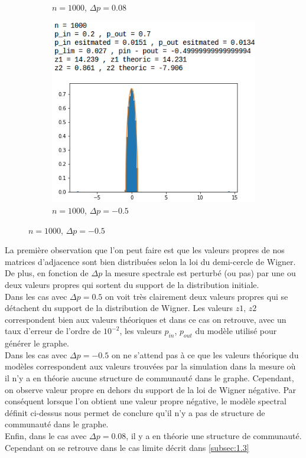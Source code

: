 \begin{figure}[H]
\begin{subfigure}{.5\textwidth}
		\caption{$n=1000$, $\Delta p=0.08$}
	\end{subfigure}
	\begin{subfigure}{.5\textwidth}
		\centering
		\includegraphics[scale=0.58]{static/spectral_n1000_pin02_pout07.png}
		\caption{$n=1000$, $\Delta p=-0.5$}
	\end{subfigure}
\end{figure}

La première observation que l'on peut faire est que les valeurs propres de nos matrices d'adjacence sont bien distribuées selon la loi du demi-cercle de Wigner.
De plus, en fonction de $\Delta p$ la mesure spectrale est perturbé (ou pas) par une ou deux valeurs propres qui sortent du support de la distribution initiale.\\

Dans les cas avec $\Delta p = 0.5$ on voit très clairement deux valeurs propres qui se détachent du support de la distribution de Wigner.
Les valeurs $z1$, $z2$ correspondent bien aux valeurs théoriques et dans ce cas on retrouve, avec un taux d'erreur de l'ordre de $10^{-2}$, les valeurs $p_{in}$, $p_{out}$ du modèle utilisé pour générer le graphe.\\
Dans les cas avec $\Delta p = -0.5$ on ne s'attend pas à ce que les valeurs théorique du modèles correspondent aux valeurs trouvées par la simulation dans la mesure où il n'y a en théorie aucune structure de communauté dans le graphe.
Cependant, on observe valeur propre en dehors du support de la loi de Wigner négative.
Par conséquent lorsque l'on obtient une valeur propre négative, le modèle spectral définit ci-dessus nous permet de conclure qu'il n'y a pas de structure de communauté dans le graphe.\\
Enfin, dans le cas avec $\Delta p = 0.08$, il y a en théorie une structure de communauté. 
Cependant on se retrouve dans le cas limite décrit dans \autoref{subsec:1.3}  
